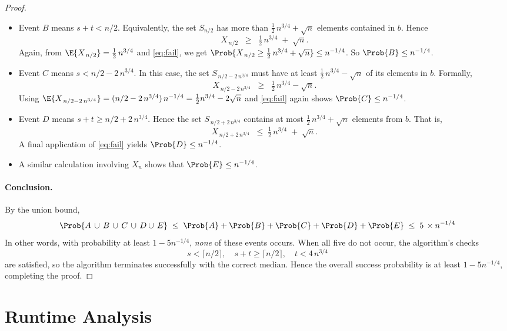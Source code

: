 \begin{proof}
\begin{itemize}
    \item Event \(B\) means \(s+t < n/2\). Equivalently, the set \(S_{n/2}\) has more than \(\tfrac12\,n^{3/4} + \sqrt{n}\) elements contained in \(b\). Hence
    \[
    X_{\,n/2} \;\;\ge\;\; \tfrac12\,n^{3/4} \;+\; \sqrt{n}.
    \]
    Again, from \(\E{X_{\,n/2}} = \tfrac12\,n^{3/4}\) and \eqref{eq:fail}, we get 
    \(\Prob{X_{\,n/2} \ge \tfrac12\,n^{3/4} + \sqrt{n}} \le n^{-1/4}\). So \(\Prob{B}\le n^{-1/4}\).
    
    \item Event \(C\) means \(s < n/2 - 2\,n^{3/4}\). In this case, the set \(S_{\,n/2 - 2\,n^{3/4}}\) must have at least \(\tfrac12\,n^{3/4} - \sqrt{n}\) of its elements in \(b\). Formally,
    \[
    X_{\,n/2 - 2\,n^{3/4}} \;\;\ge\;\; \tfrac12\,n^{3/4}-\sqrt{n}.
    \]
    Using \(\E{X_{\,n/2 - 2\,n^{3/4}}} = (n/2 - 2\,n^{3/4})\,n^{-1/4} = \frac{1}{2}n^{3/4} - 2\sqrt{n}\)  and \eqref{eq:fail} again shows 
    \(\Prob{C} \le n^{-1/4}\).
    
    \item Event \(D\) means \(s+t \ge n/2 + 2\,n^{3/4}\). Hence the set \(S_{\,n/2 + 2\,n^{3/4}}\) contains at most \(\tfrac12\,n^{3/4} + \sqrt{n}\) elements from \(b\). That is,
    \[
    X_{\,n/2 + 2\,n^{3/4}} 
    \;\;\le\;
    \tfrac12\,n^{3/4} \;+\; \sqrt{n}.
    \]
    A final application of \eqref{eq:fail} yields \(\Prob{D}\le n^{-1/4}\).

    \item A similar calculation involving $X_n$ shows that \(\Prob{E}\le n^{-1/4}\).    
\end{itemize}

    \paragraph{Conclusion.}
    By the union bound,
    \[
    \Prob{A \,\cup\, B \,\cup\, C \,\cup\, D \cup\, E}
    \;\le\;
    \Prob{A}+\Prob{B}+\Prob{C}+\Prob{D}+\Prob{E}
    \;\le\;
    5\,\times n^{-1/4}
    \]
    In other words, with probability at least \(1 - 5n^{-1/4}\), \emph{none} of these events occurs. When all five do not occur, the algorithm’s checks
    \[
    s < \lceil n/2\rceil,\quad
    s + t \ge \lceil n/2\rceil,\quad
    t < 4\,n^{3/4}
    \]
    are satisfied, so the algorithm terminates successfully with the correct median. Hence the overall success probability is at least \(1 - 5n^{-1/4}\), completing the proof.
    \end{proof}
    

\section*{Runtime Analysis}

